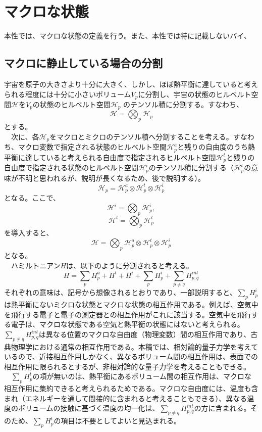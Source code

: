 \section{マクロな状態}
本性では、マクロな状態の定義を行う。また、本性では特に記載しないバイ、
\subsection{マクロに静止している場合の分割}
宇宙を原子の大きさより十分に大きく、しかし、ほぼ熱平衡に達していると考えられる程度には十分に小さいボリューム$V_p$に分割し、宇宙の状態のヒルベルト空間$\mathcal{H}$を$V_p$の状態のヒルベルト空間$\mathcal{H}_p$ のテンソル積に分割する。すなわち、
\begin{equation}
    \mathcal{H} = \bigotimes_p \mathcal{H}_p
\end{equation}
とする。\\
　次に、各$\mathcal{H}_p$をマクロとミクロのテンソル積へ分割することを考える。すなわち、マクロ変数で指定される状態のヒルベルト空間$\mathcal{H}_p^a$と残りの自由度のうち熱平衡に達していると考えられる自由度で指定されるヒルベルト空間$\mathcal{H}_p^t$と残りの自由度で指定される状態のヒルベルト空間$\mathcal{H}_p^i$のテンソル積に分割する（$\mathcal{H}_p^t$の意味が不明と思われるが、説明が長くなるため、後で説明する）。
\begin{equation}
    \mathcal{H}_p = \mathcal{H}_p^a \otimes \mathcal{H}_p^t \otimes \mathcal{H}_p^i
\end{equation}
となる。ここで、
\begin{equation}
    \mathcal{H}^i = \bigotimes_p \mathcal{H}_p^i,
\end{equation}
\begin{equation}
    \mathcal{H}^t = \bigotimes_p \mathcal{H}_p^t
\end{equation}
を導入すると、
\begin{equation}
    \mathcal{H} = \bigotimes_p \mathcal{H}_p^a \otimes  \mathcal{H}_p^t \otimes  \mathcal{H}_p^i
\end{equation}
となる。\\
　ハミルトニアン$H$は、以下のように分割されると考える。
\begin{equation}
H=\sum_pH_p^a + H^t + H^i + \sum_p H_p^i + \sum_{p \neq q} H^{int}_{p,q}
\end{equation}
それぞれの意味は、記号から想像されるとおりであり、一部説明すると、$\sum_p H_p^i$は熱平衡にないミクロな状態とマクロな状態の相互作用である。例えば、空気中を飛行する電子と電子の測定器との相互作用がこれに該当する。空気中を飛行する電子は、マクロな状態である空気と熱平衡の状態にはないと考えられる。$\sum_{p \neq q} H^{int}_{p,q}$は異なる位置のマクロな自由度（物理変数）間の相互作用であり、古典物理学における通常の相互作用である。本稿では、相対論的量子力学を考えているので、近接相互作用しかなく、異なるボリューム間の相互作用は、表面での相互作用に限られるとするが、非相対論的な量子力学を考えることもできる。\\
　$\sum_p H_p^t$の項が無いのは、熱平衡にあるボリューム間の相互作用は、マクロな相互作用に集約できると考えられるためである。マクロな自由度には、温度も含まれ（エネルギーを通して間接的に含まれると考えることもできる）、異なる温度のボリュームの接触に基づく温度の均一化は、$\sum_{p \neq q} H^{int}_{p,q}$の方に含まれる。そのため、$\sum_p H_p^t$の項目は不要としてよいと見込まれる。